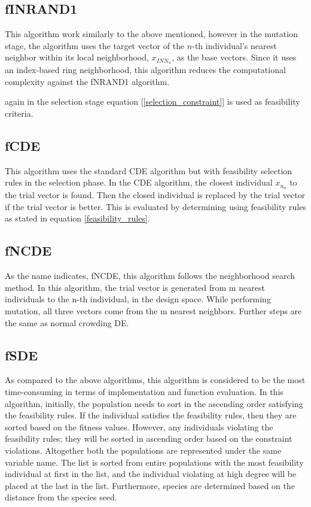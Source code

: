 \subsection{fINRAND1}
This algorithm work similarly to the above mentioned, however in the mutation stage, the algorithm uses the target vector of the \(n\)-th individual’s nearest neighbor within its local neighborhood, $x_{INN_n}$, as the base vectors. Since it uses an index-based ring neighborhood, this algorithm reduces the computational complexity against the fNRAND1 algorithm.

again in the selection stage equation [\ref{selection_constraint}] is used as feasibility criteria.


\subsection{fCDE}
This algorithm uses the standard CDE algorithm but with feasibility selection rules in the selection phase. In the CDE algorithm, the closest individual $ {x}_{u_{n}} $ to the trial vector is found. Then the closed individual is replaced by the trial vector if the trial vector is better. This is evaluated by determining using feasibility rules as stated in equation \ref{feasibility_rules}.




\subsection{fNCDE}
As the name indicates, fNCDE, this algorithm follows the neighborhood search method. In this algorithm, the trial vector is generated from m nearest individuals to the n-th individual, in the design space. While performing mutation, all three vectors come from the m nearest neighbors. Further steps are the same as normal crowding DE.


\subsection{fSDE}
As compared to the above algorithms, this algorithm is considered to be the most time-consuming in terms of implementation and function evaluation. In this algorithm, initially, the population needs to sort in the ascending order satisfying the feasibility rules. If the individual satisfies the feasibility rules, then they are sorted based on the fitness values. However, any individuals violating the feasibility rules; they will be sorted in ascending order based on the constraint violations. Altogether both the populations are represented under the same variable name. The list is sorted from entire populations with the most feasibility individual at first in the list, and the individual violating at high degree will be placed at the last in the list. Furthermore, species are determined based on the distance from the species seed.  

